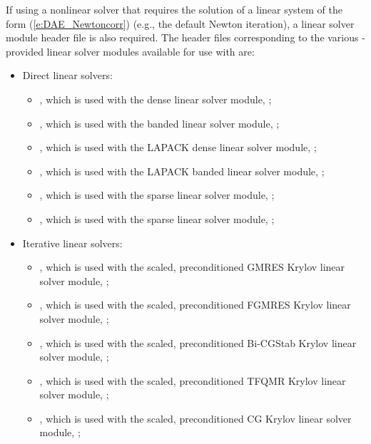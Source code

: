 If using a nonlinear solver that requires the solution of a linear
system of the form (\ref{e:DAE_Newtoncorr}) (e.g., the default Newton
iteration), a linear solver module header file is also required.
The header files corresponding to the various {\sundials}-provided
linear solver modules available for use with {\ida} are:
\begin{itemize}
\item Direct linear solvers:
  \begin{itemize}
  \item {},
    which is used with the dense linear solver module,
    {\sunlinsoldense};

  \item {},
    which is used with the banded linear solver module,
    {\sunlinsolband};

  \item {},
    which is used with the LAPACK dense linear solver module,
    {\sunlinsollapdense};

  \item {},
    which is used with the LAPACK banded linear solver module,
    {\sunlinsollapband};

  \item {},
    which is used with the {\klu} sparse linear solver module,
    {\sunlinsolklu};

  \item {},
    which is used with the {\superlumt} sparse linear solver
    module, {\sunlinsolslumt};
  \end{itemize}

\item Iterative linear solvers:
  \begin{itemize}
  \item {},
    which is used with the scaled, preconditioned GMRES Krylov linear
    solver module, {\sunlinsolspgmr};

  \item {},
    which is used with the scaled, preconditioned FGMRES Krylov linear
    solver module, {\sunlinsolspfgmr};

  \item {},
    which is used with the scaled, preconditioned Bi-CGStab Krylov
    linear solver module, {\sunlinsolspbcgs};

  \item {},
    which is used with the scaled, preconditioned TFQMR Krylov linear
    solver module, {\sunlinsolsptfqmr};

  \item {},
    which is used with the scaled, preconditioned CG Krylov linear
    solver module, {\sunlinsolpcg};
  \end{itemize}
\end{itemize}


